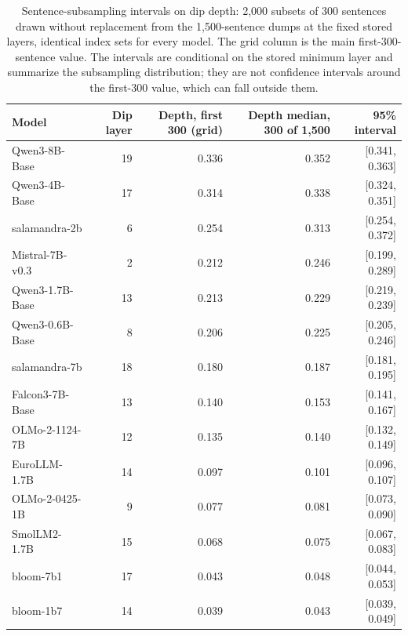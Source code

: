 \documentclass{article} %
\begin{document}
\begin{table}[h]\caption{Sentence-subsampling intervals on dip depth: 2,000 subsets of 300 sentences drawn without replacement from the 1,500-sentence dumps at the fixed stored layers, identical index sets for every model. The grid column is the main first-300-sentence value. The intervals are conditional on the stored minimum layer and summarize the subsampling distribution; they are not confidence intervals around the first-300 value, which can fall outside them.}\label{tab:boot}
\begin{center}\scriptsize
\begin{tabular}{lrrrr}
\toprule
Model & Dip layer & Depth, first 300 (grid) & Depth median, 300 of 1,500 & 95\% interval \\
\midrule
Qwen3-8B-Base & 19 & 0.336 & 0.352 & [0.341, 0.363] \\
Qwen3-4B-Base & 17 & 0.314 & 0.338 & [0.324, 0.351] \\
salamandra-2b & 6 & 0.254 & 0.313 & [0.254, 0.372] \\
Mistral-7B-v0.3 & 2 & 0.212 & 0.246 & [0.199, 0.289] \\
Qwen3-1.7B-Base & 13 & 0.213 & 0.229 & [0.219, 0.239] \\
Qwen3-0.6B-Base & 8 & 0.206 & 0.225 & [0.205, 0.246] \\
salamandra-7b & 18 & 0.180 & 0.187 & [0.181, 0.195] \\
Falcon3-7B-Base & 13 & 0.140 & 0.153 & [0.141, 0.167] \\
OLMo-2-1124-7B & 12 & 0.135 & 0.140 & [0.132, 0.149] \\
EuroLLM-1.7B & 14 & 0.097 & 0.101 & [0.096, 0.107] \\
OLMo-2-0425-1B & 9 & 0.077 & 0.081 & [0.073, 0.090] \\
SmolLM2-1.7B & 15 & 0.068 & 0.075 & [0.067, 0.083] \\
bloom-7b1 & 17 & 0.043 & 0.048 & [0.044, 0.053] \\
bloom-1b7 & 14 & 0.039 & 0.043 & [0.039, 0.049] \\
\bottomrule
\end{tabular}
\end{center}

\end{table}
\end{document}
